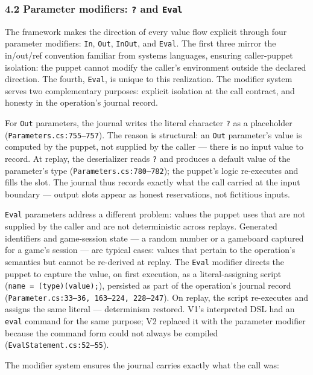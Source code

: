\documentclass[
]{article}
\let\origtexttt\texttt%
\renewcommand{\texttt}[1]{\origtexttt{\seqsplit{#1}}}%
\let\texttt\origtexttt%
\begin{document}
\subsubsection{\texorpdfstring{4.2 Parameter modifiers: \texttt{?} and
\texttt{Eval}}{4.2 Parameter modifiers: ? and Eval}}\label{parameter-modifiers-and-eval}

The framework makes the direction of every value flow explicit through
four parameter modifiers: \texttt{In}, \texttt{Out}, \texttt{InOut}, and
\texttt{Eval}. The first three mirror the in/out/ref convention familiar
from systems languages, ensuring caller-puppet isolation: the puppet
cannot modify the caller's environment outside the declared direction.
The fourth, \texttt{Eval}, is unique to this realization. The modifier
system serves two complementary purposes: explicit isolation at the call
contract, and honesty in the operation's journal record.

For \texttt{Out} parameters, the journal writes the literal character
\texttt{?} as a placeholder (\texttt{Parameters.cs:755–757}). The reason
is structural: an \texttt{Out} parameter's value is computed by the
puppet, not supplied by the caller --- there is no input value to
record. At replay, the deserializer reads \texttt{?} and produces a
default value of the parameter's type (\texttt{Parameters.cs:780–782});
the puppet's logic re-executes and fills the slot. The journal thus
records exactly what the call carried at the input boundary --- output
slots appear as honest reservations, not fictitious inputs.

\texttt{Eval} parameters address a different problem: values the puppet
uses that are not supplied by the caller and are not deterministic
across replays. Generated identifiers and game-session state --- a
random number or a gameboard captured for a game's session --- are
typical cases: values that pertain to the operation's semantics but
cannot be re-derived at replay. The \texttt{Eval} modifier directs the
puppet to capture the value, on first execution, as a literal-assigning
script (\texttt{name\ =\ (type)(value);}), persisted as part of the
operation's journal record
(\texttt{Parameter.cs:33–36,\ 163–224,\ 228–247}). On replay, the script
re-executes and assigns the same literal --- determinism restored. V1's
interpreted DSL had an \texttt{eval} command for the same purpose; V2
replaced it with the parameter modifier because the command form could
not always be compiled (\texttt{EvalStatement.cs:52–55}).

The modifier system ensures the journal carries exactly what the call
was:
\end{document}
